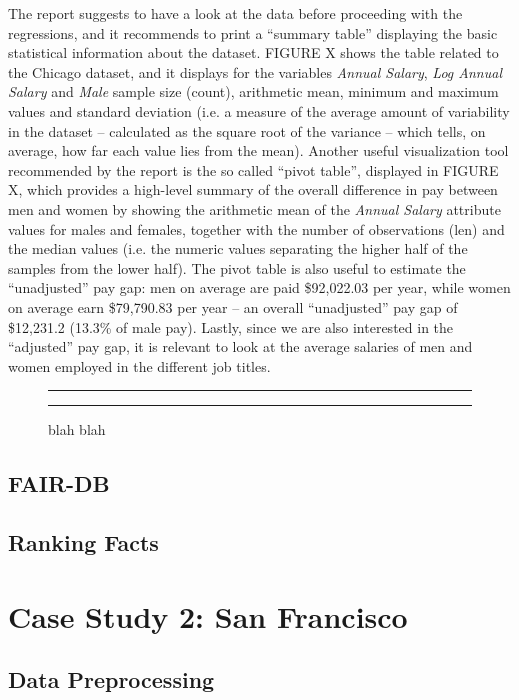 The report suggests to have a look at the data before proceeding with the regressions, and it recommends to print a ``summary table'' displaying the basic statistical information about the dataset. FIGURE X shows the table related to the Chicago dataset, and it displays for the variables \textit{Annual Salary}, \textit{Log Annual Salary} and \textit{Male} sample size (count), arithmetic mean, minimum and maximum values and standard deviation (i.e. a measure of the average amount of variability in the dataset -- calculated as the square root of the variance -- which tells, on average, how far each value lies from the mean). Another useful visualization tool recommended by the report is the so called ``pivot table'', displayed in FIGURE X, which provides a high-level summary of the overall difference in pay between men and women by showing the arithmetic mean of the \textit{Annual Salary} attribute values for males and females, together with the number of observations (len) and the median values (i.e. the numeric values separating the higher half of the samples from the lower half). The pivot table is also useful to estimate the ``unadjusted'' pay gap: men on average are paid \$92,022.03 per year, while women on average earn \$79,790.83 per year -- an overall ``unadjusted'' pay gap of \$12,231.2 (13.3\% of male pay). Lastly, since we are also interested in the ``adjusted'' pay gap, it is relevant to look at the average salaries of men and women employed in the different job titles.

\begin{figure}
  \noindent\rule{\linewidth}{0.4pt}\par
  \resizebox{\linewidth}{!}{%
    \BVerbatimInput{figures/chicago_glassdoor1.txt}%
  }
  \noindent\rule{\linewidth}{0.4pt}
  \caption{blah blah}
  \label{chicago_glassdoor1}
\end{figure}


\subsection{FAIR-DB}
\subsection{Ranking Facts}


\section{Case Study 2: San Francisco}
\subsection{Data Preprocessing}
